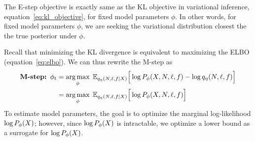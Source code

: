 The E-step objective is exactly same as the KL objective in variational inference, equation~\eqref{eq:kl_objective}, for fixed model parameters $\phi$. 
In other words, for fixed model parameters $\phi$, we are seeking the variational distribution closest the the true posterior under $\phi$. 

Recall that minimizing the KL divergence is equivalent to maximizing the ELBO (equation~\eqref{eq:elbo}). We can thus rewrite the M-step as 
\begin{align}
    \text{{\bf M-step: }} \phi_{t} &= \operatorname*{arg\,max}_{\phi} \; \mathbb{E}_{q_{\eta}(N, \ell, f | X)}\Big[\log P_\phi(X, N, \ell, f) - \log q_\eta(N, \ell, f)\Big] \\
    &= \operatorname*{arg\,max}_{\phi} \; \mathbb{E}_{q_{\eta}(N, \ell, f | X)}\Big[\log P_\phi(X, N, \ell, f)\Big]    \label{eq:m_step}
\end{align} 
To estimate model parameters, the goal is to optimize the marginal log-likelihood $\log P_\phi(X)$; however, since $\log P_\phi(X)$ is intractable, we optimize a lower bound as a surrogate for $\log P_\phi(X)$. 

